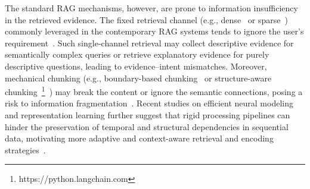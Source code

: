 The standard RAG mechanisms, however, are prone to information insufficiency in the retrieved evidence.
The fixed retrieval channel (e.g., dense~\cite{borgeaud2022improving, izacard2022few, lewis2020retrieval} or sparse~\cite{ram2023context, huly2024old}) commonly leveraged in the contemporary RAG systems tends to ignore the user's requirement~\cite{wang2024evaluating}.
Such single-channel retrieval may collect descriptive evidence for semantically complex queries or retrieve explanatory evidence for purely descriptive questions, leading to evidence–intent mismatches.
Moreover, mechanical chunking (e.g., boundary-based chunking~\cite{finardi2024chronicles} or structure-aware chunking~\footnote{https://python.langchain.com}~\cite{zhang2026text}) may break the content or ignore the semantic connections, posing a risk to information fragmentation~\citep{izacard2021leveraging}.
Recent studies on efficient neural modeling and representation learning further suggest that rigid processing pipelines can hinder the preservation of temporal and structural dependencies in sequential data, motivating more adaptive and context-aware retrieval and encoding strategies~\citep{8368077,9540752}.

